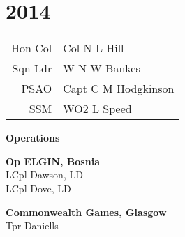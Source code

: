 \chapter*{2014}

\vspace*{20mm}

\begin{center}
  \begin{tabular}{rl}
    Hon Col & Col N L Hill \\
    Sqn Ldr & W N W Bankes \\
    PSAO & Capt C M Hodgkinson \\
    SSM & WO2 L Speed \\
  \end{tabular}
\end{center}

\vspace*{20mm}

\begin{center}
  \Large
  \textbf{Operations}
\end{center}

\begin{multicols}{2}
  \noindent
  \textbf{Op ELGIN, Bosnia} \\
  LCpl Dawson, LD \\
  LCpl Dove, LD \\
  
  \columnbreak
  
  \noindent
  \textbf{Commonwealth Games, Glasgow} \\
  Tpr Daniells \\
\end{multicols}

